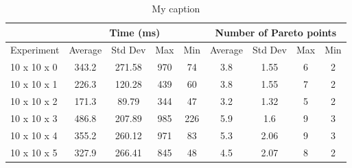 \documentclass{article}
\begin{document}
	     \begin{table}[]
	     	\footnotesize
	     	\centering
	     	\caption{My caption}
	     	\label{table3}
	     	\begin{tabular}{lcccccccc}
	     		\multicolumn{1}{l|}{}           & \multicolumn{4}{c|}{Time (ms)}                                                                                         & \multicolumn{4}{c|}{Number of Pareto points}                                                                      \\ \hline
	     		\multicolumn{1}{l|}{Experiment} & \multicolumn{1}{c|}{Average} & \multicolumn{1}{c|}{Std Dev} & \multicolumn{1}{c|}{Max} & \multicolumn{1}{c|}{Min} & \multicolumn{1}{c|}{Average} & \multicolumn{1}{c|}{Std Dev} & \multicolumn{1}{c|}{Max} & \multicolumn{1}{c|}{Min} \\ \hline
	     		10 x 10 x 0                     & 343.2                        & 271.58                       & 970                      & 74                       & 3.8                          & 1.55                         & 6                        & 2                        \\
	     		10 x 10 x 1                     & 226.3                        & 120.28                       & 439                      & 60                       & 3.8                          & 1.55                         & 7                        & 2                        \\
	     		10 x 10 x 2                     & 171.3                        & 89.79                        & 344                      & 47                       & 3.2                          & 1.32                         & 5                        & 2                        \\
	     		10 x 10 x 3                     & 486.8                        & 207.89                       & 985                      & 226                      & 5.9                          & 1.6                          & 9                        & 3                        \\
	     		10 x 10 x 4                     & 355.2                        & 260.12                       & 971                      & 83                       & 5.3                          & 2.06                         & 9                        & 3                        \\
	     		10 x 10 x 5                     & 327.9                        & 266.41                       & 845                      & 48                       & 4.5                          & 2.07                         & 8                        & 2                        \\

\end{tabular}
\end{table}
\end{document}
